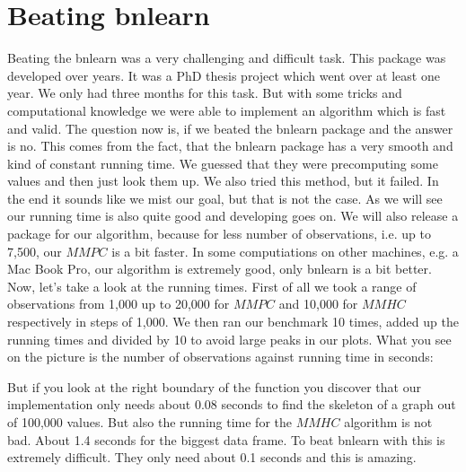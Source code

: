 \chapter{Beating bnlearn}

	Beating the bnlearn was a very challenging and difficult task. This package was developed over years. It was a PhD thesis project which went over at least one year. We only had three months for this task. But with some tricks and computational knowledge we were able to implement an algorithm which is fast and valid. The question now is, if we beated the bnlearn package and the answer is no. This comes from the fact, that the bnlearn package has a very smooth and kind of constant running time. We guessed that they were precomputing some values and then just look them up. We also tried this method, but it failed. In the end it sounds like we mist our goal, but that is not the case. As we will see our running time is also quite good and developing goes on. We will also release a package for our algorithm, because for less number of observations, i.e. up to 7,500, our $MMPC$ is a bit faster. In some computiations on other machines, e.g. a Mac Book Pro, our algorithm is extremely good, only bnlearn is a bit better.\\

	Now, let's take a look at the running times. First of all we took a range of observations from 1,000 up to 20,000 for $MMPC$ and 10,000 for $MMHC$ respectively in steps of 1,000. We then ran our benchmark 10 times, added up the running times and divided by 10 to avoid large peaks in our plots. What you see on the picture is the number of observations against running time in seconds:


	But if you look at the right boundary of the function you discover that our implementation only needs about 0.08 seconds to find the skeleton of a graph out of 100,000 values. But also the running time for the $MMHC$ algorithm is not bad. About 1.4 seconds for the biggest data frame. To beat bnlearn with this is extremely difficult. They only need about 0.1 seconds and this is amazing.



